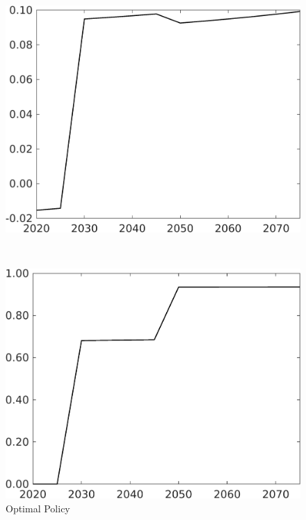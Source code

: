 \begin{figure}[h!!]
	\centering
	\caption{Optimal Policy }\label{fig:optPol}
	\begin{minipage}[]{0.4\textwidth}
		\includegraphics[width=1\textwidth]{../../codding_model/own_basedOnFried/optimalPol_190722_tidiedUp/figures/all_July22/taul_SingleAltPolOPT_T_NoTaus_regime3_spillover0_noskill0_sep1_xgrowth0_etaa0.79.png}
	\end{minipage}
	\begin{minipage}[]{0.1\textwidth}
		\
	\end{minipage}
	\begin{minipage}[]{0.4\textwidth}
		\includegraphics[width=1\textwidth]{../../codding_model/own_basedOnFried/optimalPol_190722_tidiedUp/figures/all_July22/tauf_SingleAltPolOPT_T_NoTaus_regime3_spillover0_noskill0_sep1_xgrowth0_etaa0.79.png}
	\end{minipage}
\end{figure} 

